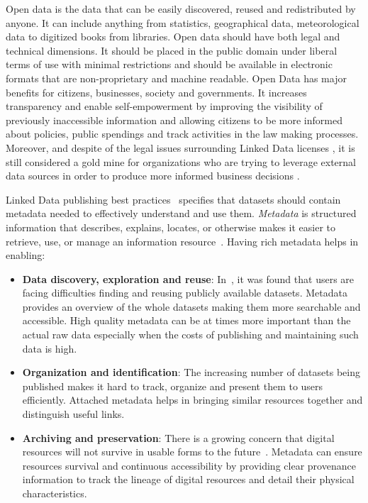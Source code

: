 \documentclass[runningheads,a4paper]{llncs}
\begin{document}
Open data is the data that can be easily discovered, reused and redistributed by anyone. It can include anything from statistics, geographical data, meteorological data to digitized books from libraries. Open data should have both legal and technical dimensions. It should be placed in the public domain under liberal terms of use with minimal restrictions and should be available in electronic formats that are non-proprietary and machine readable. Open Data has major benefits for citizens, businesses, society and governments. It increases transparency and enable self-empowerment by improving the visibility of previously inaccessible information and allowing citizens to be more informed about policies, public spendings and track activities in the law making processes. Moreover, and despite of the legal issues surrounding Linked Data licenses \cite{nomoneyLOD}, it is still considered a gold mine for organizations who are trying to leverage external data sources in order to produce more informed business decisions \cite{Boyd2011}.

Linked Data publishing best practices~\cite{Bizer:2011:EWG:2075914.2075915} specifies that datasets should contain metadata needed to effectively understand and use them. \textit{Metadata} is structured information that describes, explains, locates, or otherwise makes it easier to retrieve, use, or manage an information resource~\cite{NISO:04}. Having rich metadata helps in enabling:

\begin{itemize}
  \item \textbf{Data discovery, exploration and reuse}: In~\cite{Graham:11}, it was found that users are facing difficulties finding and reusing publicly available datasets. Metadata provides an overview of the whole datasets making them more searchable and accessible. High quality metadata can be at times more important than the actual raw data especially when the costs of publishing and maintaining such data is high.
  \item \textbf{Organization and identification}: The increasing number of datasets being published makes it hard to track, organize and present them to users efficiently. Attached metadata helps in bringing similar resources together and distinguish useful links.
  \item \textbf{Archiving and preservation}: There is a growing concern that digital resources will not survive in usable forms to the future~\cite{NISO:04}. Metadata can ensure resources survival and continuous accessibility by providing clear provenance information to track the lineage of digital resources and detail their physical characteristics.
\end{itemize}
\end{document}
